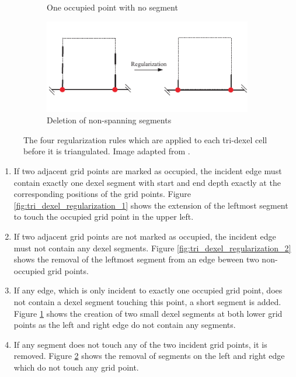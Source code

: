 \begin{figure}[h]
\begin{subfigure}[t]{0.45\textwidth}
		\caption{One occupied point with no segment}
		\label{fig:tri_dexel_regularization_3}
	\end{subfigure}
	\begin{subfigure}[t]{0.45\textwidth}
		\centering
		\includegraphics[width=\textwidth]{images/tri_dexel_regularization_4}
		\caption{Deletion of non-spanning segments}
		\label{fig:tri_dexel_regularization_4}
	\end{subfigure}
	\caption{
		The four regularization rules which are applied to each tri-dexel cell before it is triangulated.
		Image adapted from \cite{tridexel_reconstruction}.
	}
	\label{fig:tri_dexel_regularization}
\end{figure}

\begin{enumerate}
	\item If two adjacent grid points are marked as occupied, the incident edge must contain exactly one dexel segment with start and end depth exactly at the corresponding positions of the grid points.
	Figure \ref{fig:tri_dexel_regularization_1} shows the extension of the leftmost segment to touch the occupied grid point in the upper left.

	\item If two adjacent grid points are not marked as occupied, the incident edge must not contain any dexel segments.
	Figure \ref{fig:tri_dexel_regularization_2} shows the removal of the leftmost segment from an edge beween two non-occupied grid points.

	\item If any edge, which is only incident to exactly one occupied grid point, does not contain a dexel segment touching this point, a short segment is added.
	Figure \ref{fig:tri_dexel_regularization_3} shows the creation of two small dexel segments at both lower grid points as the left and right edge do not contain any segments.

	\item If any segment does not touch any of the two incident grid points, it is removed.
	Figure \ref{fig:tri_dexel_regularization_4} shows the removal of segments on the left and right edge which do not touch any grid point.
\end{enumerate}

